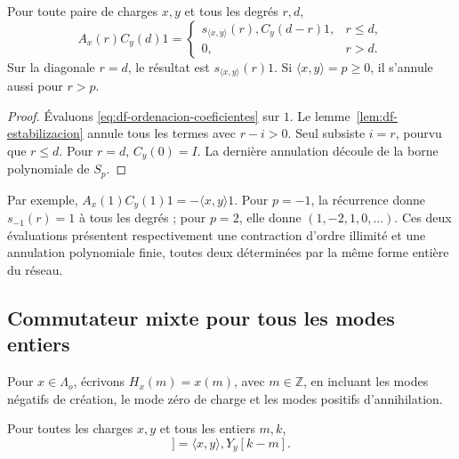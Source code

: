 \begin{theorem}
\label{thm:df-contraccion-vacio} Pour toute paire de charges \(x,y\) et tous les degrés \(r,d\),
\begin{equation}
 A_x(r)C_y(d)1=
 \begin{cases}
 s_{\langle x,y\rangle}(r),C_y(d-r)1,&r\leq d,\\
 0,&r>d.
 \end{cases}
 \label{eq:df-contraccion-vacio}
\end{equation}
Sur la diagonale \(r=d\), le résultat est \(s_{\langle x,y\rangle}(r)1\). Si \(\langle x,y\rangle=p\geq0\), il s’annule aussi pour \(r>p\).
\end{theorem}

\begin{proof}
Évaluons \eqref{eq:df-ordenacion-coeficientes} sur \(1\). Le lemme~\ref{lem:df-estabilizacion} annule tous les termes avec \(r-i>0\). Seul subsiste \(i=r\), pourvu que \(r\leq d\). Pour \(r=d\), \(C_y(0)=I\). La dernière annulation découle de la borne polynomiale de \(S_p\).
\end{proof}

Par exemple, \(A_x(1)C_y(1)1=-\langle x,y\rangle1\). Pour \(p=-1\), la récurrence donne \(s_{-1}(r)=1\) à tous les degrés ; pour \(p=2\), elle donne \((1,-2,1,0,\ldots)\). Ces deux évaluations présentent respectivement une contraction d’ordre illimité et une annulation polynomiale finie, toutes deux déterminées par la même forme entière du réseau.

\subsection{Commutateur mixte pour tous les modes entiers}
\label{subsec:df-conmutador-mixto}


Pour \(x\in\Lambda_o\), écrivons \(H_x(m)=x(m)\), avec \(m\in\mathbb Z\), en incluant les modes négatifs de création, le mode zéro de charge et les modes positifs d’annihilation.

\begin{theorem}
\label{thm:df-conmutador-mixto} Pour toutes les charges \(x,y\) et tous les entiers \(m,k\),
\begin{equation}
 [H_x(m),Y_y[k]]
 =\langle x,y\rangle,Y_y[k-m].
 \label{eq:df-conmutador-mixto}
\end{equation}
\end{theorem}

